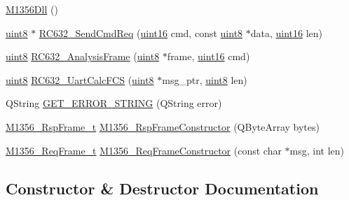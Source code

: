 \begin{DoxyCompactItemize}
\item 
\mbox{\hyperlink{class_m1356_dll_a38686d41a3476f15cf676795806aff7d}{M1356\+Dll}} ()
\item 
\mbox{\hyperlink{inc_2m1356dll_8h_adde6aaee8457bee49c2a92621fe22b79}{uint8}} $\ast$ \mbox{\hyperlink{class_m1356_dll_ab86ae59233d587f4688470796cbb85b1}{R\+C632\+\_\+\+Send\+Cmd\+Req}} (\mbox{\hyperlink{inc_2m1356dll_8h_a05f6b0ae8f6a6e135b0e290c25fe0e4e}{uint16}} cmd, const \mbox{\hyperlink{inc_2m1356dll_8h_adde6aaee8457bee49c2a92621fe22b79}{uint8}} $\ast$data, \mbox{\hyperlink{inc_2m1356dll_8h_a05f6b0ae8f6a6e135b0e290c25fe0e4e}{uint16}} len)
\item 
\mbox{\hyperlink{inc_2m1356dll_8h_adde6aaee8457bee49c2a92621fe22b79}{uint8}} \mbox{\hyperlink{class_m1356_dll_a40aed3801baa294bf828c5ab794ef82e}{R\+C632\+\_\+\+Analysis\+Frame}} (\mbox{\hyperlink{inc_2m1356dll_8h_adde6aaee8457bee49c2a92621fe22b79}{uint8}} $\ast$frame, \mbox{\hyperlink{inc_2m1356dll_8h_a05f6b0ae8f6a6e135b0e290c25fe0e4e}{uint16}} cmd)
\item 
\mbox{\hyperlink{inc_2m1356dll_8h_adde6aaee8457bee49c2a92621fe22b79}{uint8}} \mbox{\hyperlink{class_m1356_dll_a048d48e3154a48258d25391b19de938c}{R\+C632\+\_\+\+Uart\+Calc\+F\+CS}} (\mbox{\hyperlink{inc_2m1356dll_8h_adde6aaee8457bee49c2a92621fe22b79}{uint8}} $\ast$msg\+\_\+ptr, \mbox{\hyperlink{inc_2m1356dll_8h_adde6aaee8457bee49c2a92621fe22b79}{uint8}} len)
\item 
Q\+String \mbox{\hyperlink{class_m1356_dll_ad35a73433e99eb6ccce5f3729f7ae283}{G\+E\+T\+\_\+\+E\+R\+R\+O\+R\+\_\+\+S\+T\+R\+I\+NG}} (Q\+String error)
\item 
\mbox{\hyperlink{struct_m1356___rsp_frame__t}{M1356\+\_\+\+Rsp\+Frame\+\_\+t}} \mbox{\hyperlink{class_m1356_dll_a40131e8263bd201208a37ec1826d5310}{M1356\+\_\+\+Rsp\+Frame\+Constructor}} (Q\+Byte\+Array bytes)
\item 
\mbox{\hyperlink{struct_m1356___req_frame__t}{M1356\+\_\+\+Req\+Frame\+\_\+t}} \mbox{\hyperlink{class_m1356_dll_a44099cd5f4bbdf9f37507eb7fa5477d6}{M1356\+\_\+\+Req\+Frame\+Constructor}} (const char $\ast$msg, int len)
\end{DoxyCompactItemize}


\subsection{Constructor \& Destructor Documentation}
\mbox{\label{class_m1356_dll_a38686d41a3476f15cf676795806aff7d}} 
